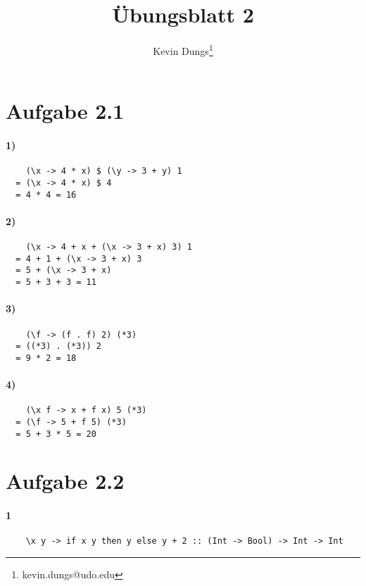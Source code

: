 \documentclass[a4paper]{scrartcl}
\title{Übungsblatt 2}
\author{Kevin Dungs\thanks{kevin.dungs@udo.edu}}
\begin{document}
\maketitle

\section*{Aufgabe 2.1}
\paragraph{1)}
\begin{verbatim}
    (\x -> 4 * x) $ (\y -> 3 + y) 1
  = (\x -> 4 * x) $ 4
  = 4 * 4 = 16
\end{verbatim}

\paragraph{2)}
\begin{verbatim}
    (\x -> 4 + x + (\x -> 3 + x) 3) 1
  = 4 + 1 + (\x -> 3 + x) 3
  = 5 + (\x -> 3 + x)
  = 5 + 3 + 3 = 11
\end{verbatim}

\paragraph{3)}
\begin{verbatim}
    (\f -> (f . f) 2) (*3)
  = ((*3) . (*3)) 2
  = 9 * 2 = 18
\end{verbatim}

\paragraph{4)}
\begin{verbatim}
    (\x f -> x + f x) 5 (*3)
  = (\f -> 5 + f 5) (*3)
  = 5 + 3 * 5 = 20
\end{verbatim}


\section*{Aufgabe 2.2}
\paragraph{1}
\begin{verbatim}
    \x y -> if x y then y else y + 2 :: (Int -> Bool) -> Int -> Int
\end{verbatim}
\end{document}
